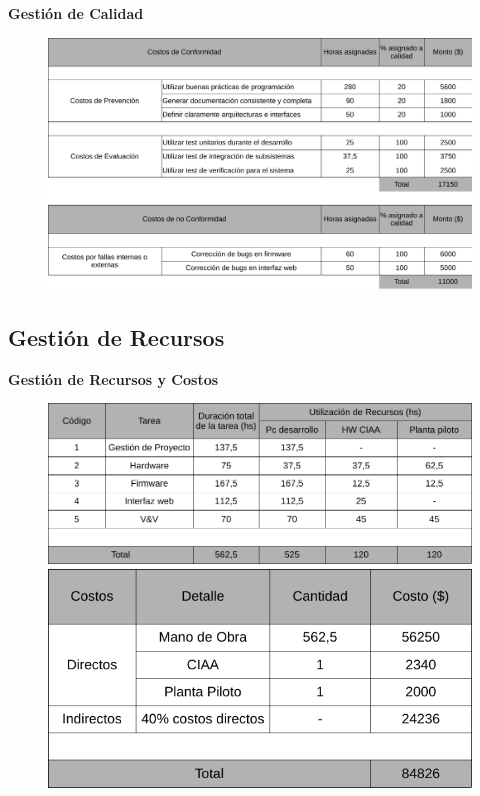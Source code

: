 \documentclass{beamer}
\begin{document}
\begin{frame}{\textbf{Gestión de Calidad}}
\fontsize{14pt}{15}\selectfont
	\begin{figure}[H]
	  	\includegraphics[width=1\textwidth]{./imagenes/tabla-calidad.pdf}
	\end{figure}	  
\end{frame}

\subsection[Recursos]{Gestión de Recursos}

\begin{frame}{\textbf{Gestión de Recursos y Costos}}
\fontsize{14pt}{15}\selectfont
	\begin{figure}[H]
	  	\includegraphics[width=1\textwidth]{./imagenes/tabla-recursos.pdf}\vspace{10px}
	  	\includegraphics[width=.6\textwidth]{./imagenes/tabla-presupuesto.pdf}
	\end{figure}	  

\end{frame}
\end{document}
